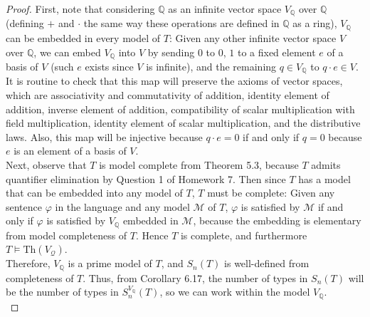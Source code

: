 \documentclass{article}
\begin{document}
\begin{enumerate}[label={\bf Q\arabic*:}]
    \begin{proof}
      First, note that considering $\mathbb{Q}$ as an infinite vector space
      $V_\mathbb{Q}$ over $\mathbb{Q}$ (defining $+$ and $\cdot$ the same
      way these operations are defined in $\mathbb{Q}$ as a ring),
      $V_\mathbb{Q}$ can be embedded in every model of $T$: Given any other
      infinite vector space $V$ over $\mathbb{Q}$, we can embed
      $V_\mathbb{Q}$ into $V$ by sending $0$ to $0$, $1$ to a fixed element
      $e$ of a basis of $V$ (such $e$ exists since $V$ is infinite), and
      the remaining $q\in V_\mathbb{Q}$ to $q\cdot e\in V$. It is routine
      to check that this map will preserve the axioms of vector spaces,
      which are associativity and commutativity of addition, identity
      element of addition, inverse element of addition, compatibility of
      scalar multiplication with field multiplication, identity element of
      scalar multiplication, and the distributive laws. Also, this map will
      be injective because $q\cdot e=0$ if and only if $q=0$ because $e$ is
      an element of a basis of $V$. \\

      Next, observe that $T$ is model complete from Theorem 5.3, because
      $T$ admits quantifier elimination by Question 1 of Homework 7. Then
      since $T$ has a model that can be embedded into any model of $T$, $T$
      must be complete: Given any sentence $\varphi$ in the language and
      any model $\mathcal{M}$ of $T$, $\varphi$ is satisfied by
      $\mathcal{M}$ if and only if $\varphi$ is satisfied by
      $V_\mathbb{Q}$ embedded in $\mathcal{M}$, because the embedding is
      elementary from model completeness of $T$. Hence $T$ is complete, and
      furthermore $T\models\text{Th}(V_\mathcal{Q})$. \\

      Therefore, $V_\mathbb{Q}$ is a prime model of $T$, and $S_n(T)$ is
      well-defined from completeness of $T$. Thus, from Corollary 6.17, the
      number of types in $S_n(T)$ will be the number of types in
      $S_n^{V_{\mathbb{Q}}}(T)$, so we can work within the model
      $V_\mathbb{Q}$. \\


\end{proof}
\end{enumerate}
\end{document}
